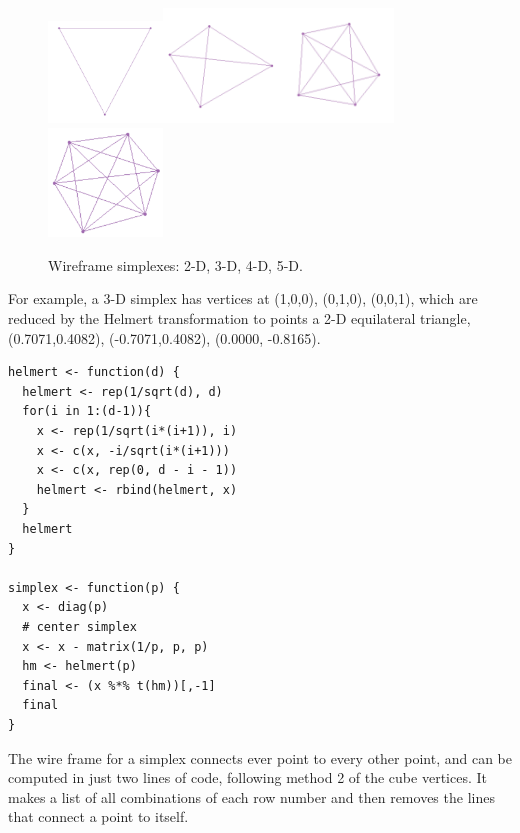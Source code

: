 \documentclass[article]{jss}
\begin{document}
\begin{figure}[ht]
\centerline{
\includegraphics[width=1.2in]{simplex2.pdf}\includegraphics[width=1.2in]{simplex3.pdf}\includegraphics[width=1.2in]{simplex4.pdf}\includegraphics[width=1.2in]{simplex5.pdf}}
\caption{Wireframe simplexes: 2-D, 3-D, 4-D, 5-D.}
\end{figure}

For example, a 3-D simplex has vertices at (1,0,0), (0,1,0), (0,0,1),
which are reduced by the Helmert transformation to points a 2-D
equilateral triangle, (0.7071,0.4082), (-0.7071,0.4082), (0.0000,
-0.8165).

\begin{verbatim}
helmert <- function(d) {
  helmert <- rep(1/sqrt(d), d)
  for(i in 1:(d-1)){
    x <- rep(1/sqrt(i*(i+1)), i)
    x <- c(x, -i/sqrt(i*(i+1)))
    x <- c(x, rep(0, d - i - 1))
    helmert <- rbind(helmert, x)
  }
  helmert
}

simplex <- function(p) {
  x <- diag(p)
  # center simplex
  x <- x - matrix(1/p, p, p) 
  hm <- helmert(p) 
  final <- (x %*% t(hm))[,-1]
  final
}
\end{verbatim}

The wire frame for a simplex connects ever point to every other point, and can
be computed in just two lines of code, following method 2 of the cube
vertices. It makes a list of all combinations of each row number and then
removes the lines that connect a point to itself.
\end{document}
